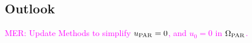 \documentclass[fleqn,10pt]{wlscirep}
\newcommand{\mer}[1]{\textcolor{magenta}{#1}}
\newcommand{\draft}[1]{\textcolor{gray}{#1}}
\begin{document}
\draft{\lipsum[1-2]}


\subsection*{Outlook}

\draft{\lipsum[1]}

\newpage

\mer{MER: Update Methods to simplify $u_{\rm PAR} = 0$, and $u_0 = 0$ in $\Omega_{\rm PAR}$.}
\end{document}
